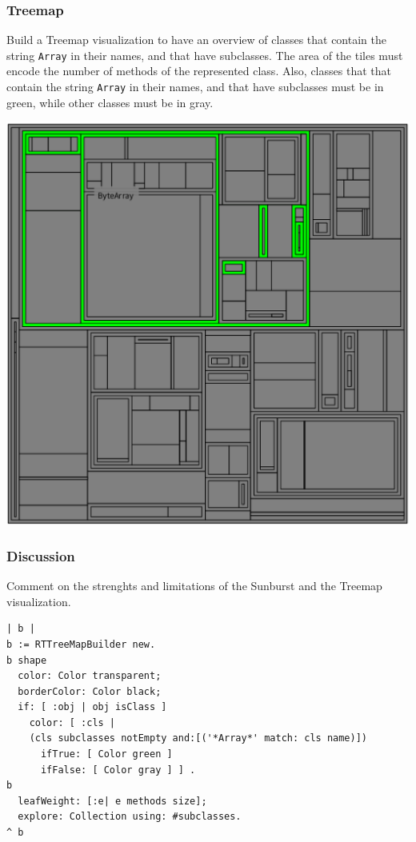 \documentclass [11pt, a4wide, twoside]{article}
\begin{document}
\subsubsection*{Treemap}
Build a Treemap visualization to have an overview of classes that contain the string \texttt{Array} in their names, and that have subclasses. The area of the tiles must encode the number of methods of the represented class. Also, classes that that contain the string \texttt{Array} in their names, and that have subclasses must be in green, while other classes must be in gray.


\includegraphics[scale=0.2]{images/treemap.png}

\subsubsection*{Discussion}
Comment on the strenghts and limitations of the Sunburst and the Treemap visualization. 
\begin{lstlisting}
| b |
b := RTTreeMapBuilder new.
b shape
  color: Color transparent;
  borderColor: Color black;
  if: [ :obj | obj isClass ]
    color: [ :cls | 
    (cls subclasses notEmpty and:[('*Array*' match: cls name)])
      ifTrue: [ Color green ]
      ifFalse: [ Color gray ] ] .
b
  leafWeight: [:e| e methods size];
  explore: Collection using: #subclasses.
^ b
\end{lstlisting}
\end{document}
